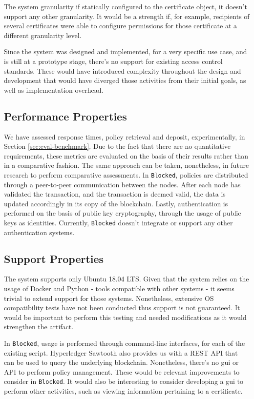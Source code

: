 The system granularity if statically configured to the certificate object, it doesn't support any other granularity. It would be a strength if, for example, recipients of several certificates were able to configure permissions for those certificate at a different granularity level.

Since the system was designed and implemented, for a very specific use case, and is still at a prototype stage, there's no support for existing access control standards. These would have introduced complexity throughout the design and development that would have diverged those activities from their initial goals, as well as implementation overhead.

\subsection{Performance Properties}

We have assessed response times, policy retrieval and deposit, experimentally, in Section \ref{sec:eval-benchmark}. Due to the fact that there are no quantitative requirements, these metrics are evaluated on the basis of their results rather than in a comparative fashion. The same approach can be taken, nonetheless, in future research to perform comparative assessments. In \texttt{Blocked}, policies are distributed through a peer-to-peer communication between the nodes. After each node has validated the transaction, and the transaction is deemed valid, the data is updated accordingly in its copy of the blockchain. Lastly, authentication is performed on the basis of public key cryptography, through the usage of public keys as identities. Currently, \texttt{Blocked} doesn't integrate or support any other authentication systems.

\subsection{Support Properties}

The system supports only Ubuntu 18.04 LTS. Given that the system relies on the usage of Docker and Python - tools compatible with other systems - it seems trivial to extend support for those systems. Nonetheless, extensive OS compatibility tests have not been conducted thus support is not guaranteed. It would be important to perform this testing and needed modifications as it would strengthen the artifact.

In \texttt{Blocked}, usage is performed through command-line interfaces, for each of the existing script. Hyperledger Sawtooth also provides us with a REST API that can be used to query the underlying blockchain. Nonetheless, there's no \gls{gui} or API to perform policy management. These would be relevant improvements to consider in \texttt{Blocked}. It would also be interesting to consider developing a \gls{gui} to perform other activities, such as viewing information pertaining to a certificate.

